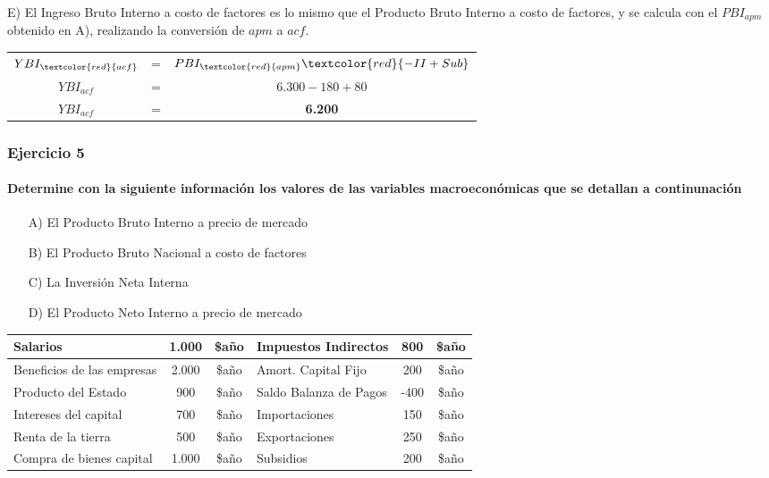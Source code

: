 \documentclass[12pt,a4paper]{article}
\newcommand{\consigna}[1]{\paragraph{\indent #1} \hspace{0pt}}
\begin{document}
        \hrulefill
        
        E) El Ingreso Bruto Interno a costo de factores es lo mismo que el Producto Bruto Interno a costo de factores, y se calcula con el $ PBI_{apm} $ obtenido en A), realizando la conversión de $apm$ a $acf$.
        
		\begin{table}[H]
		\centering
        	\begin{tabular}{ c c c }
               	$ YBI_{\textcolor{red}{acf}} $ &=& $ PBI_{\textcolor{red}{apm}} \textcolor{red}{- II + Sub} $ \\
                $ YBI_{acf} $ &=& $ 6{.}300 - 180 + 80 $ \\
                $ YBI_{acf} $ &=& \textbf{6.200}
			\end{tabular}
		\end{table}
        
        
        \newpage
    
    	\subsubsection{Ejercicio 5}
        
		\consigna{Determine con la siguiente información los valores de las variables macroeconómicas que se detallan a continunación}
        
        \begin{itemize}
			\item[A)]	El Producto Bruto Interno a precio de mercado
			\item[B)]	El Producto Bruto Nacional a costo de factores
            \item[C)]	La Inversión Neta Interna
            \item[D)]	El Producto Neto Interno a precio de mercado
		\end{itemize}
        
        \begin{table}[H]
        \centering
        	\begin{tabular}{ | l | c | c | l | c | c | }
            \hline
            Salarios			& 1.000	& \$año	& Impuestos Indirectos	& 800 & \$año \\ \hline
            Beneficios de las empresas &2.000& \$año	& Amort. Capital Fijo	& 200 & \$año \\ \hline
            Producto del Estado	& 900	& \$año	& Saldo Balanza de Pagos &-400 & \$año \\ \hline
            Intereses del capital& 700	& \$año	& Importaciones			& 150 & \$año \\ \hline
            Renta de la tierra	& 500	& \$año	& Exportaciones			& 250 & \$año \\ \hline
            Compra de bienes capital& 1.000	& \$año	& Subsidios				& 200 & \$año \\ \hline
			\end{tabular}
		\end{table}
        
\end{document}
